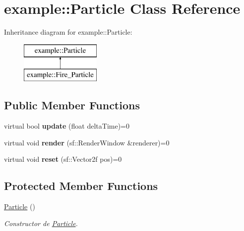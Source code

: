 \hypertarget{classexample_1_1_particle}{}\section{example\+::Particle Class Reference}
\label{classexample_1_1_particle}
Inheritance diagram for example\+::Particle\+:\begin{figure}[H]
\begin{center}
\leavevmode
\includegraphics[height=2.000000cm]{classexample_1_1_particle}
\end{center}
\end{figure}
\subsection*{Public Member Functions}
\begin{DoxyCompactItemize}
\item 
\mbox{\label{classexample_1_1_particle_a193ea67e4569b6f3b50ca0dbbede5af7}} 
virtual bool {\bfseries update} (float delta\+Time)=0
\item 
\mbox{\label{classexample_1_1_particle_ab48206fec5a65bdd4d8e71a4caf88a1f}} 
virtual void {\bfseries render} (sf\+::\+Render\+Window \&renderer)=0
\item 
\mbox{\label{classexample_1_1_particle_a949a7ef42c6763ec0020279c39fd6a4f}} 
virtual void {\bfseries reset} (sf\+::\+Vector2f pos)=0
\end{DoxyCompactItemize}
\subsection*{Protected Member Functions}
\begin{DoxyCompactItemize}
\item 
\mbox{\hyperlink{classexample_1_1_particle_a8e1787431cc8d15460f63feb3dfbff5a}{Particle}} ()
\begin{DoxyCompactList}\small\item\em Constructor de \mbox{\hyperlink{classexample_1_1_particle}{Particle}}. \end{DoxyCompactList}\end{DoxyCompactItemize}
